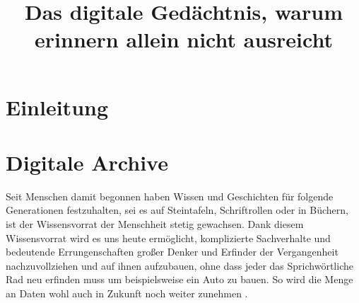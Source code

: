 \documentclass[conference,compsoc,final,a4paper]{IEEEtran}
\newcommand{\autoren}[0]{Nockel, Sascha}
\newcommand{\dokumententitel}[0]{Das digitale Gedächtnis, warum erinnern allein nicht ausreicht}
\begin{document}
\title{\dokumententitel}

\author{
  \IEEEauthorblockN{\autoren}
}

\maketitle
\thispagestyle{plain}
\pagestyle{plain}


\begin{abstract}

\end{abstract}

{\small\tableofcontents}

\section{Einleitung}


\section{Digitale Archive}
Seit Menschen damit begonnen haben Wissen und Geschichten für folgende Generationen festzuhalten, sei es auf Steintafeln, Schriftrollen oder in Büchern, ist der Wissensvorrat der Menschheit stetig gewachsen. Dank diesem Wissensvorrat wird es uns heute ermöglicht, komplizierte Sachverhalte und bedeutende Errungenschaften großer Denker und Erfinder der Vergangenheit nachzuvollziehen und auf ihnen aufzubauen, ohne dass jeder das Sprichwörtliche Rad neu erfinden muss um beispielsweise ein Auto zu bauen. So wird die Menge an Daten wohl auch in Zukunft noch weiter zunehmen \autocite{Reinsel2018}.
\end{document}
